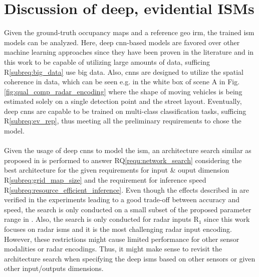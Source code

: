 \section{Discussion of deep, evidential ISMs}
\label{sec:disc_deep_ev_isms}
Given the ground-truth occupancy maps and a reference geo \gls{irm}, the trained \gls{ism} models can be analyzed. Here, deep \gls{cnn}-based models are favored over other machine learning approaches since they have been proven in the literature and in this work to be capable of utilizing large amounts of data, sufficing R\ref{subreq:big_data} use big data. Also, \gls{cnn}s are designed to utilize the spatial coherence in data, which can be seen e.g. in the white box of scene A in Fig. \ref{fig:qual_comp_radar_encoding} where the shape of moving vehicles is being estimated solely on a single detection point and the street layout. Eventually, deep \gls{cnn}s are capable to be trained on multi-class classification tasks, sufficing R\ref{subreq:ev_rep}, thus meeting all the preliminary requirements to chose the model.
\\\\
Given the usage of deep \gls{cnn}s to model the \gls{ism}, an architecture search similar as proposed in \cite{radosavovic2020designing} is performed to answer RQ\ref{requ:network_search} considering the best architecture for the given requirements for input \& ouput dimension R\ref{subreq:grid_map_size} and the requirement for inference speed R\ref{subreq:resource_efficient_inference}. Even though the effects described in \cite{radosavovic2020designing} are verified in the experiments leading to a good trade-off between accuracy and speed, the search is only conducted on a small subset of the proposed parameter range in \cite{radosavovic2020designing}. Also, the search is only conducted for radar inputs R$_1$ since this work focuses on radar \gls{ism}s and it is the most challenging radar input encoding. However, these restrictions might cause limited performance for other sensor modalities or radar encodings. Thus, it might make sense to revisit the architecture search when specifying the deep \gls{ism}s based on other sensors or given other input/outputs dimensions.
\\\\
